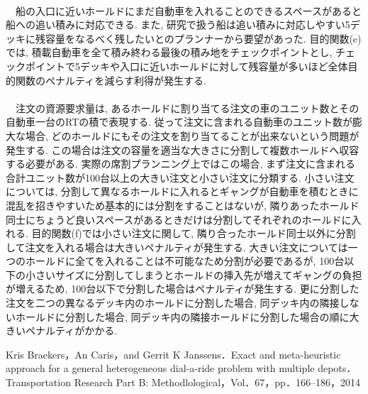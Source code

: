 \documentclass[a4j,11pt,twocolumn]{jsarticle}
\begin{document}
 \\
　船の入口に近いホールドにまだ自動車を入れることのできるスペースがあると船への追い積みに対応できる. また, 研究で扱う船は追い積みに対応しやすい5デッキに残容量をなるべく残したいとのプランナーから要望があった. 目的関数(e)では, 積載自動車を全て積み終わる最後の積み地をチェックポイントとし, チェックポイントで5デッキや入口に近いホールドに対して残容量が多いほど全体目的関数のペナルティを減らす利得が発生する. \\


 \\
　注文の資源要求量は, あるホールドに割り当てる注文の車のユニット数とその自動車一台のRTの積で表現する. 従って注文に含まれる自動車のユニット数が膨大な場合, どのホールドにもその注文を割り当てることが出来ないという問題が発生する. この場合は注文の容量を適当な大きさに分割して複数ホールドへ収容する必要がある. 実際の席割プランニング上ではこの場合, まず注文に含まれる合計ユニット数が100台以上の大きい注文と小さい注文に分類する. 小さい注文については, 分割して異なるホールドに入れるとギャングが自動車を積むときに混乱を招きやすいため基本的には分割をすることはないが, 隣りあったホールド同士にちょうど良いスペースがあるときだけは分割してそれぞれのホールドに入れる. 目的関数(f)では小さい注文に関して, 隣り合ったホールド同士以外に分割して注文を入れる場合は大きいペナルティが発生する. 大きい注文については一つのホールドに全てを入れることは不可能なため分割が必要であるが,  100台以下の小さいサイズに分割してしまうとホールドの挿入先が増えてギャングの負担が増えるため, 100台以下で分割した場合はペナルティが発生する. 更に分割した注文を二つの異なるデッキ内のホールドに分割した場合, 同デッキ内の隣接しないホールドに分割した場合, 同デッキ内の隣接ホールドに分割した場合の順に大きいペナルティがかかる. \\

\begin{thebibliography}{99}
   Kris Braekers，An Caris，and Gerrit K Janssens．Exact and meta-heuristic approach for a general heterogeneous dial-a-ride problem with multiple depots．Transportation Research Part B: Methodlological，Vol．67，pp．166--186，2014
\end{thebibliography}
\end{document}
